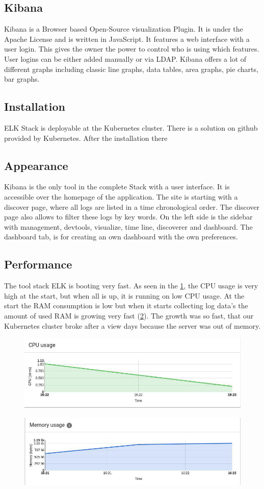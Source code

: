 \subsection{Kibana}
Kibana is a Browser based Open-Source visualization Plugin. It is under the Apache License and is written in JavaScript. It features a web interface with a user login. This gives the owner the power to control who is using which features. User logins can be either added manually or via LDAP.
Kibana offers a lot of different graphs including classic line graphs, data tables, area graphs, pie charts, bar graphs.
\subsection{Installation}
ELK Stack is deployable at the Kubernetes cluster. There is a solution on github provided by Kubernetes. After the installation there 
\subsection{Appearance}%
Kibana is the only tool in the complete Stack with a user interface. It is accessible over the homepage of the application. The site is starting with a discover page, where all logs are listed in a time chronological order. The discover page also allows to filter these logs by key words. On the left side is the sidebar with management, devtools, visualize, time line, discoverer and dashboard. The dashboard tab, is for creating an own dashboard with the own preferences.
\subsection{Performance}
The tool stack ELK is booting very fast. As seen in the \cref{fig:ELK_CPU}, the CPU usage is very high at the start, but when all is up, it is running on low CPU usage. At the start the RAM consumption is low but when it starts collecting log data's the amount of used RAM is growing very fast (\cref{fig:ELK_MEM}). The growth was so fast, that our Kubernetes cluster broke after a view days because the server was out of memory.
\begin{figure}
	\centering
	\includegraphics[width=0.5\linewidth]{Bilder/Performance/ELK_CPU}
	\caption{}
	\label{fig:ELK_CPU}
\end{figure}
\begin{figure}
	\centering
	\includegraphics[width=0.5\linewidth]{Bilder/Performance/ELK_MEM}
	\caption{}
	\label{fig:ELK_MEM}
\end{figure}
